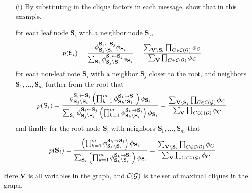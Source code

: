 \documentclass[11pt]{article}
\renewcommand{\vec}[1]{\mathbf{#1}}
\begin{document}
\begin{itemize}
\item[(i)] By substituting in the clique factors in each message, show that in this example,

for each leaf node $\vec{S}_i$ with a neighbor node $\vec{S}_j$,
{\small
\begin{align*}
p(\vec{S}_i) =
\frac{
\phi^{\vec{S}_i \gets \vec{S}_j}_{\vec{S}_j \setminus \vec{S}_i} \phi_{\vec{S}_i}
}{
\sum_{\vec{S}_i}
\phi^{\vec{S}_i \gets \vec{S}_j}_{\vec{S}_j \setminus \vec{S}_i} \phi_{\vec{S}_i}
}
=
\frac{
\sum_{\vec{V} \setminus \vec{S}_i} \prod_{C \in {\cal C}({\cal G})} \phi_C
}{
\sum_{\vec{V}} \prod_{C \in {\cal C}({\cal G})} \phi_C
}
\end{align*}
}
for each non-leaf note $\vec{S}_i$ with a neighbor $\vec{S}_j$ closer to the root, and neighbors $\vec{S}_1, \ldots, \vec{S}_m$ further from the root that
{\small
\begin{align*}
p(\vec{S}_i) =
\frac{
\phi^{\vec{S}_i \gets \vec{S}_j}_{\vec{S}_j \setminus \vec{S}_i} 
\left( \prod_{k=1}^m \phi^{\vec{S}_k \to \vec{S}_i}_{\vec{S}_k \setminus \vec{S}_i} \right) \phi_{\vec{S}_i}
}{
\sum_{\vec{S}_i} \phi^{\vec{S}_i \gets \vec{S}_j}_{\vec{S}_j \setminus \vec{S}_i} 
\left( \prod_{k=1}^m \phi^{\vec{S}_k \to \vec{S}_i}_{\vec{S}_k \setminus \vec{S}_i} \right) \phi_{\vec{S}_i}
}
=
\frac{
\sum_{\vec{V} \setminus \vec{S}_i} \prod_{C \in {\cal C}({\cal G})} \phi_C
}{
\sum_{\vec{V}} \prod_{C \in {\cal C}({\cal G})} \phi_C
}
\end{align*}
}
and finally for the root node $\vec{S}_i$ with neighbors $\vec{S}_1, \ldots, \vec{S}_m$ that
{\small
\begin{align*}
p(\vec{S}_i) =
\frac{
\left( \prod_{k=1}^m \phi^{\vec{S}_k \to \vec{S}_i}_{\vec{S}_k \setminus \vec{S}_i} \right) \phi_{\vec{S}_i}
}{
\sum_{\vec{S}_i} \left( \prod_{k=1}^m \phi^{\vec{S}_k \to \vec{S}_i}_{\vec{S}_k \setminus \vec{S}_i} \right) \phi_{\vec{S}_i}
}
=
\frac{
\sum_{\vec{V} \setminus \vec{S}_i} \prod_{C \in {\cal C}({\cal G})} \phi_C
}{
\sum_{\vec{V}} \prod_{C \in {\cal C}({\cal G})} \phi_C
}
\end{align*}
}
\end{itemize}

Here $\vec{V}$ is all variables in the graph, and ${\cal C}({\cal G})$ is the set of maximal cliques in the graph.

\begin{answertext}{18cm}{}
\end{answertext} 

\newpage
\end{document}
